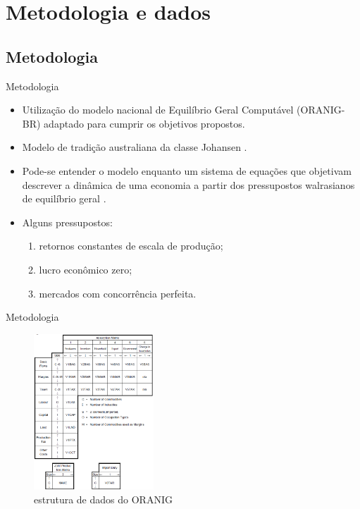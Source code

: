 \documentclass[10pt]{sintefbeamer}
\begin{document}
\section{Metodologia e dados}

\subsection[]{Metodologia}

\begin{frame}{Metodologia}
	\begin{itemize}[<+->]
		\item Utilização do modelo nacional de Equilíbrio Geral Computável (ORANIG-BR) adaptado para cumprir os objetivos propostos.
		
		\item Modelo de tradição australiana da classe Johansen \cite{johansen63}.
		
		\item Pode-se entender o modelo enquanto um sistema de equações que objetivam descrever a dinâmica de uma economia a partir dos pressupostos walrasianos de equilíbrio geral \cite{horridge00}.
		
		\item Alguns pressupostos:
		
		\begin{enumerate}
			\item retornos constantes de escala de produção;
			\item lucro econômico zero;
			\item mercados com concorrência perfeita.
		\end{enumerate}
	\end{itemize}
\end{frame}

\begin{frame}{Metodologia}
	\begin{figure}
		\centering
		\includegraphics[width=4.5cm]{Imagens/001.png}
		\caption{estrutura de dados do ORANIG}
		\footnotesize
		\vspace{-0.2cm}
	\end{figure}
\end{frame}
\end{document}
